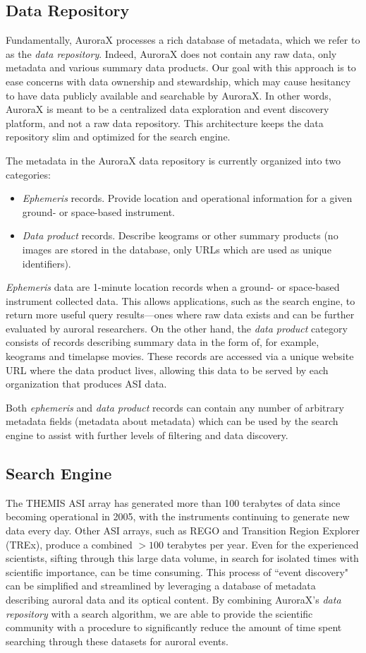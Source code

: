 \documentclass[utf8]{FrontiersinHarvard} %
\begin{document}
\subsection{Data Repository}
Fundamentally, AuroraX processes a rich database of metadata, which we refer to as the \textit{data repository}. Indeed, AuroraX does not contain any raw data, only metadata and various summary data products. Our goal with this approach is to ease concerns with data ownership and stewardship, which may cause hesitancy to have data publicly available and searchable by AuroraX. In other words, AuroraX is meant to be a centralized data exploration and event discovery platform, and not a raw data repository. This architecture keeps the data repository slim and optimized for the search engine.

The metadata in the AuroraX data repository is currently organized into two categories: 
\begin{itemize}
    \item \textit{Ephemeris} records. Provide location and operational information for a given ground- or space-based instrument.
    \item \textit{Data product} records. Describe keograms or other summary products (no images are stored in the database, only URLs which are used as unique identifiers).
\end{itemize} \textit{Ephemeris} data are 1-minute location records when a ground- or space-based instrument collected data. This allows applications, such as the search engine, to return more useful query results---ones where raw data exists and can be further evaluated by auroral researchers. On the other hand, the \textit{data product} category consists of records describing summary data in the form of, for example, keograms and timelapse movies. These records are accessed via a unique website URL where the data product lives, allowing this data to be served by each organization that produces ASI data.

Both \textit{ephemeris} and \textit{data product} records can contain any number of arbitrary metadata fields (metadata about metadata) which can be used by the search engine to assist with further levels of filtering and data discovery.

\subsection{Search Engine}
The THEMIS ASI array has generated more than 100 terabytes of data since becoming operational in 2005, with the instruments continuing to generate new data every day. Other ASI arrays, such as REGO and Transition Region Explorer (TREx), produce a combined $>100$ terabytes per year. Even for the experienced scientists, sifting through this large data volume, in search for isolated times with scientific importance, can be time consuming. This process of ``event discovery" can be simplified and streamlined by leveraging a database of metadata describing auroral data and its optical content. By combining AuroraX’s \textit{data repository} with a search algorithm, we are able to provide the scientific community with a procedure to significantly reduce the amount of time spent searching through these datasets for auroral events. 
\end{document}
